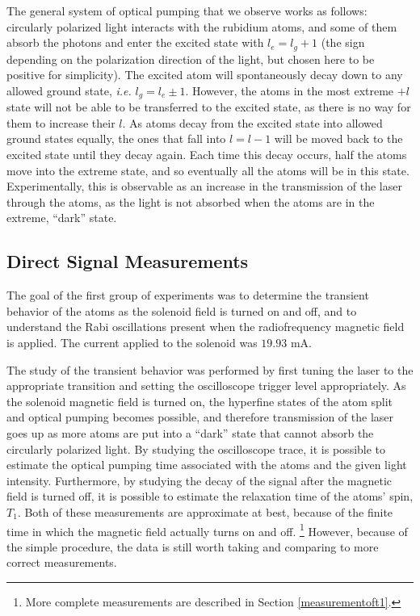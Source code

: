 The general system of optical pumping that we observe works as follows: circularly polarized light interacts with the rubidium atoms, and some of them absorb the photons and enter the excited state with $l_{e}=l_{g}+1$ (the sign depending on the polarization direction of the light, but chosen here to be positive for simplicity). The excited atom will spontaneously decay down to any allowed ground state, \emph{i.e.} $l_{g} = l_{e} \pm 1$. However, the atoms in the most extreme $+l$ state will not be able to be transferred to the excited state, as there is no way for them to increase their $l$. As atoms decay from the excited state into allowed ground states equally, the ones that fall into $l=l-1$ will be moved back to the excited state until they decay again. Each time this decay occurs, half the atoms move into the extreme state, and so eventually all the atoms will be in this state. Experimentally, this is observable as an increase in the transmission of the laser through the atoms, as the light is not absorbed when the atoms are in the extreme, ``dark'' state. 

\subsection{Direct Signal Measurements}\label{directsignalmeasurements}

The goal of the first group of experiments was to determine the transient behavior of the atoms as the solenoid field is turned on and off, and to understand the Rabi oscillations present when the radiofrequency magnetic field is applied. The current applied to the solenoid was $19.93$ mA.

The study of the transient behavior was performed by first tuning the laser to the appropriate transition and setting the oscilloscope trigger level appropriately. As the solenoid magnetic field is turned on, the hyperfine states of the atom split and optical pumping becomes possible, and therefore transmission of the laser goes up as more atoms are put into a ``dark'' state that cannot absorb the circularly polarized light. By studying the oscilloscope trace, it is possible to estimate the optical pumping time associated with the atoms and the given light intensity. Furthermore, by studying the decay of the signal after the magnetic field is turned off, it is possible to estimate the relaxation time of the atoms' spin, $T_{1}$. Both of these measurements are approximate at best, because of the finite time in which the magnetic field actually turns on and off. \footnote{More complete measurements are described in Section \ref{measurementoft1}.} However, because of the simple procedure, the data is still worth taking and comparing to more correct measurements.

